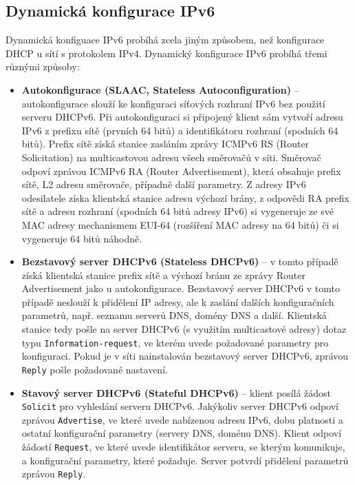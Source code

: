 \subsection{Dynamická konfigurace IPv6}\label{dynipv6}
Dynamická konfiguace IPv6 probíhá zcela jiným způsobem, než konfigurace DHCP u sítí s protokolem IPv4. Dynamický konfigurace IPv6 probíhá třemi různými způsoby:
\begin{itemize}
  \item {\bf Autokonfigurace (SLAAC, Stateless Autoconfiguration)} \cite{rfc4862} -- autokonfigurace slouží ke konfiguraci síťových rozhraní IPv6 bez použití serveru DHCPv6. Při autokonfiguraci si připojený klient sám vytvoří adresu IPv6 z prefixu sítě (prvních 64 bitů) a identifikátoru rozhraní (spodních 64 bitů). Prefix sítě získá stanice zasláním zprávy ICMPv6 RS (Router Solicitation) na multicastovou adresu všech směrovačů v síti. Směrovač odpoví zprávou ICMPv6 RA (Router Advertisement), která obsahuje prefix sítě, L2 adresu směrovače, případně další parametry. Z adresy IPv6 odesilatele získa klientská stanice adresu výchozí brány, z odpovědi RA prefix sítě a adresu rozhraní (spodních 64 bitů adresy IPv6) si vygeneruje ze své MAC adresy mechanismem EUI-64 (rozšíření MAC adresy na 64 bitů) či si vygeneruje 64 bitů náhodně.
  \item {\bf Bezstavový server DHCPv6 (Stateless DHCPv6)} \cite{rfc8415} -- v tomto případě získá klientská stanice prefix sítě a výchozí bránu ze zprávy Router Advertisement jako u autokonfigurace. Bezstavový server DHCPv6 v tomto případě neslouží k přidělení IP adresy, ale k zaslání dalších konfiguračních parametrů, např. seznamu serverů DNS, domény DNS a další. Klientská stanice tedy pošle na server DHCPv6 (s využitím multicastové adresy) dotaz typu {\tt Information-request}, ve kterém uvede požadované parametry pro konfiguraci. Pokud je v síti nainstalován bezstavový server DHCPv6, zprávou {\tt Reply} pošle požadované nastavení.
  \item {\bf Stavový server DHCPv6 (Stateful DHCPv6)} \cite{rfc8415} -- klient posílá žádost {\tt Solicit} pro vyhledání serveru DHCPv6. Jakýkoliv server DHCPv6 odpoví zprávou {\tt Advertise}, ve které uvede nabízenou adresu IPv6, dobu platnosti a ostatní konfigurační parametry (servery DNS, doménu DNS). Klient odpoví žádostí {\tt Request}, ve které uvede identifikátor serveru, se kterým komunikuje, a konfigurační parametry, které požaduje. Server potvrdí přidělení parametrů zprávou {\tt Reply}. 
\end{itemize}

